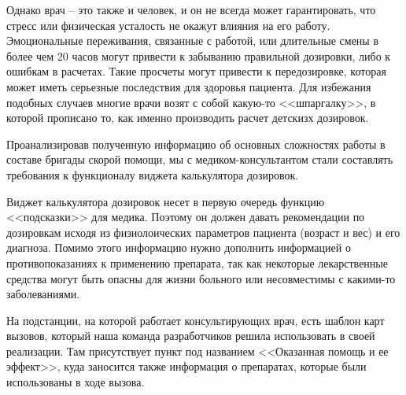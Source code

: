 \begin{enumerate}
    Однако врач -- это также и человек, и он не всегда может гарантировать, что стресс или физическая усталость не окажут влияния на его работу. Эмоциональные переживания, связанные с работой, или длительные смены в более чем 20 часов могут привести к забыванию правильной дозировки, либо к ошибкам в расчетах. Такие просчеты могут привести к передозировке, которая может иметь серьезные последствия для здоровья пациента. Для избежания подобных случаев многие врачи возят с собой какую-то <<шпаргалку>>, в которой прописано то, как именно производить расчет детскизх дозировок.
\end{enumerate}

Проанализировав полученную информацию об основных сложностях работы в составе бригады скорой помощи, мы с медиком-консультантом стали составлять требования к функционалу виджета калькулятора дозировок.

Виджет калькулятора дозировок несет в первую очередь функцию <<подсказки>> для медика. Поэтому он должен давать рекомендации по дозировкам исходя из физиолоических параметров пациента (возраст и вес) и его диагноза. Помимо этого информацию нужно дополнить информацией о противопоказаниях к применению препарата, так как некоторые лекарственные средства могут быть опасны для жизни больного или несовместимы с какими-то заболеваниями.

На подстанции, на которой работает консультирующих врач, есть шаблон карт вызовов, который наша команда разработчиков решила использовать в своей реализации. Там присутствует пункт под названием <<Оказанная помощь и ее эффект>>, куда заносится также информация о препаратах, которые были использованы в ходе вызова. 

